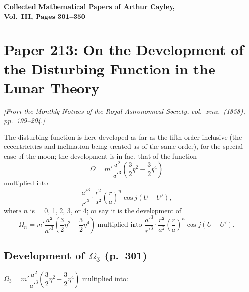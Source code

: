 \documentclass[10pt,a4paper]{article}
\theoremstyle{definition}
\begin{document}
\begin{center}
\Large\textbf{Collected Mathematical Papers of Arthur Cayley,\\Vol.~III, Pages 301--350}
\end{center}

\tableofcontents
\newpage

\section{Paper 213: On the Development of the Disturbing Function in the Lunar Theory}
\label{sec:paper213}

\noindent\textit{[From the \textit{Monthly Notices of the Royal Astronomical Society}, vol.~xviii.~(1858), pp.~199--204.]}

\medskip\noindent
The disturbing function is here developed as far as the fifth order inclusive (the eccentricities and inclination being treated as of the same order), for the special case of the moon; the development is in fact that of the function
\[
\Omega = m' \frac{a^2}{a'^3} \left(\frac{3}{2}\eta^2 - \frac{3}{2}\eta^4\right)
\]
multiplied into
\[
\frac{a'^3}{r'^3} \cdot \frac{r^2}{a^2} \left(\frac{r}{a}\right)^n \cos j(U - U'),
\]
where $n$ is = 0, 1, 2, 3, or 4; or say it is the development of
\[
\Omega_n = m' \frac{a^2}{a'^3} \left(\frac{3}{2}\eta^2 - \frac{3}{2}\eta^4\right) \text{ multiplied into } \frac{a'^3}{r'^3} \cdot \frac{r^2}{a^2} \left(\frac{r}{a}\right)^n \cos j(U - U').
\]

\subsection{Development of $\Omega_3$ (p.~301)}

\noindent
$\Omega_3 = m' \dfrac{a^2}{a'^3} \left(\dfrac{3}{2}\eta^2 - \dfrac{3}{2}\eta^4\right)$ multiplied into:
\end{document}
